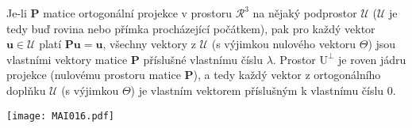 
\begin{example}\label{mai:exam012}
  Je-li \(\mathbf{P}\) matice ortogonální projekce v prostoru \(\mathcal{R}^3\) na nějaký 
  podprostor \(\mathcal{U}\) (\(\mathcal{U}\) je tedy buď rovina nebo přímka procházející 
  počátkem), pak pro každý vektor \(\mathbf{u}\in\mathcal{U}\) platí \(\mathbf{Pu} = 
  \mathbf{u}\), všechny vektory z \(\mathcal{U}\) (s výjimkou nulového vektoru \(\Theta\)) 
  jsou vlastními vektory matice $\mathbf{P}$ příslušné vlastnímu číslu \(\lambda\). Prostor 
  \(\mathrm{U}^\bot\) je roven jádru projekce (nulovému prostoru matice \(\mathbf{P}\)), 
  a tedy každý vektor z ortogonálního doplňku \(\mathcal{U}\) (s výjimkou \(\Theta\)) je 
  vlastním vektorem příslušným k vlastnímu číslu \(0\).

  {\centering
    \captionsetup{type=figure}
    \texttt{[image: MAI016.pdf]}
    \label{MAI:FIG016}
    \par}        
\end{example}